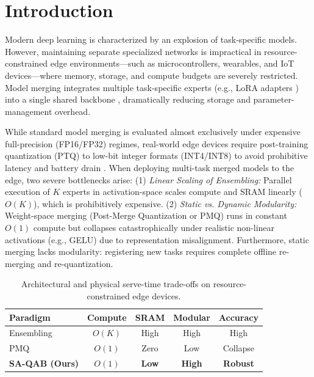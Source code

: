 \section{Introduction}
\label{sec:intro}

Modern deep learning is characterized by an explosion of task-specific models. However, maintaining separate specialized networks is impractical in resource-constrained edge environments---such as microcontrollers, wearables, and IoT devices---where memory, storage, and compute budgets are severely restricted. Model merging integrates multiple task-specific experts (e.g., LoRA adapters \cite{lora}) into a single shared backbone \cite{merging_survey}, dramatically reducing storage and parameter-management overhead.

While standard model merging is evaluated almost exclusively under expensive full-precision (FP16/FP32) regimes, real-world edge devices require post-training quantization (PTQ) to low-bit integer formats (INT4/INT8) to avoid prohibitive latency and battery drain \cite{gholami2021survey}. When deploying multi-task merged models to the edge, two severe bottlenecks arise: (1) \emph{Linear Scaling of Ensembling:} Parallel execution of $K$ experts in activation-space scales compute and SRAM linearly ($O(K)$), which is prohibitively expensive. (2) \emph{Static vs. Dynamic Modularity:} Weight-space merging (Post-Merge Quantization or PMQ) runs in constant $O(1)$ compute but collapses catastrophically under realistic non-linear activations (e.g., GELU) due to representation misalignment. Furthermore, static merging lacks modularity: registering new tasks requires complete offline re-merging and re-quantization.

\begin{table}[t]
\caption{Architectural and physical serve-time trade-offs on resource-constrained edge devices.}
\label{tab:tradeoffs}
\vskip 0.05in
\begin{center}
\begin{small}
\begin{sc}
\setlength{\tabcolsep}{3pt}
\begin{tabular}{lcccc}
\toprule
Paradigm & Compute & SRAM & Modular & Accuracy \\
\midrule
Ensembling & $O(K)$ & High & High & High \\
PMQ & $O(1)$ & Zero & Low & Collapse \\
\textbf{SA-QAB (Ours)} & \textbf{$O(1)$} & \textbf{Low} & \textbf{High} & \textbf{Robust} \\
\bottomrule
\end{tabular}
\end{sc}
\end{small}
\end{center}
\vskip -0.1in
\end{table}

